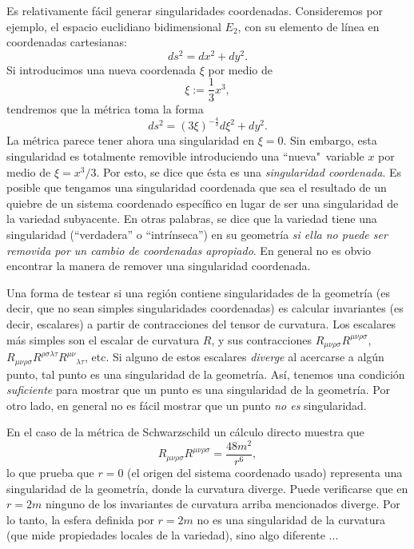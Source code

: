 Es relativamente fácil generar singularidades coordenadas. Consideremos por ejemplo, el espacio euclidiano bidimensional $E_2$, con su elemento de línea en coordenadas cartesianas:
\begin{equation}
ds^2=dx^2+dy^2.
\end{equation}
Si introducimos una nueva coordenada $\xi$ por medio de
\begin{equation}
\xi:=\frac{1}{3}x^3,
\end{equation}
tendremos que la métrica toma la forma%
\begin{equation}
ds^2 =\left( 3\xi\right) ^{-\frac{4}{3}}d\xi^2+dy^2.
\end{equation}
La métrica parece tener ahora una singularidad en $\xi=0$. Sin embargo, esta
singularidad es totalmente removible introduciendo una ``nueva"\, variable $x$ por
medio de $\xi=x^3/3$. Por esto, se dice que ésta es una
\textit{singularidad coordenada}. Es posible que tengamos una singularidad coordenada que sea el resultado de un quiebre de un sistema coordenado específico en lugar de ser una singularidad de la variedad subyacente. En otras palabras, se dice que la variedad tiene una singularidad (``verdadera'' o ``intrínseca'') en su geometría \textit{si ella no puede ser removida por un cambio de coordenadas apropiado}. En general no es obvio encontrar la manera de remover una singularidad coordenada.

Una forma de testear si una región contiene singularidades de la geometría (es decir, que no sean simples singularidades coordenadas) es calcular invariantes (es decir, escalares) a partir de contracciones del tensor de curvatura. Los escalares más simples son el escalar de curvatura
$R$, y sus contracciones $R_{\mu\nu\rho\sigma}R^{\mu\nu\rho\sigma}$, $R_{\mu\nu\rho\sigma}R^{\rho\sigma\lambda\tau}R^{\mu\nu}{}_{\lambda\tau}$, etc. Si alguno de estos escalares \textit{diverge} al acercarse a algún punto, tal punto es una singularidad de la geometría. Así, tenemos una condición \textit{suficiente}
para mostrar que un punto es una singularidad de la geometría. Por otro lado, en general no es fácil mostrar que un punto \textit{no es} singularidad.

En el caso de la métrica de Schwarzschild un cálculo directo muestra que
\begin{equation}
R_{\mu\nu\rho\sigma}R^{\mu\nu\rho\sigma}=\frac{48m^2}{r^6},
\end{equation}
lo que prueba que $r=0$ (el origen del sistema coordenado usado) representa una
singularidad de la geometría, donde la curvatura diverge. Puede verificarse que en $r=2m$ ninguno de los invariantes de curvatura arriba mencionados diverge. Por lo tanto, la esfera definida por $r=2m$ no es una singularidad de la curvatura (que mide propiedades locales de la variedad), sino algo diferente ...

